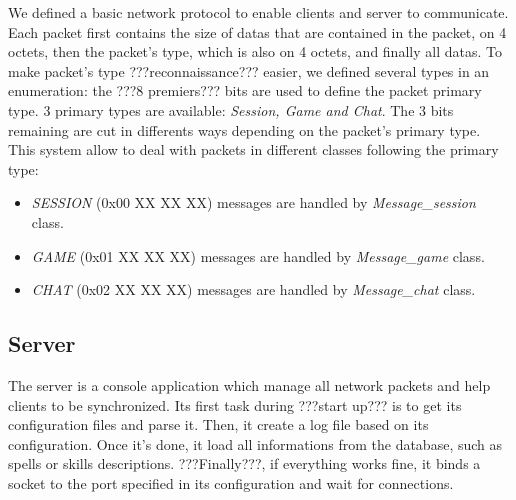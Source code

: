 \documentclass{scrreprt}
\begin{document}
				We defined a basic network protocol to enable clients and server to communicate. Each packet first contains the size of datas that are contained in the packet, on 4 octets, then the packet's type, which is also on 4 octets, and finally all datas. To make packet's type ???reconnaissance??? easier, we defined several types in an enumeration: the ???8 premiers??? bits are used to define the packet primary type. 3 primary types are available: \emph{Session, Game and Chat}. The 3 bits remaining are cut in differents ways depending on the packet's primary type. This system allow to deal with packets in different classes following the primary type:
				\begin{itemize}
				\item{\emph{SESSION} (0x00 XX XX XX) messages are handled by \emph{Message\_session} class.}
				\item{\emph{GAME} (0x01 XX XX XX) messages are handled by \emph{Message\_game} class.}
				\item{\emph{CHAT} (0x02 XX XX XX) messages are handled by \emph{Message\_chat} class.}
				\end{itemize}


				\subsection{Server}
				The server is a console application which manage all network packets and help clients to be synchronized. Its first task during ???start up??? is to  get its configuration files and parse it. Then, it create a log file based on its configuration. Once it's done, it load all informations from the database, such as spells or skills descriptions. ???Finally???, if everything works fine, it binds a socket to the port specified in its configuration and wait for connections.
\end{document}
